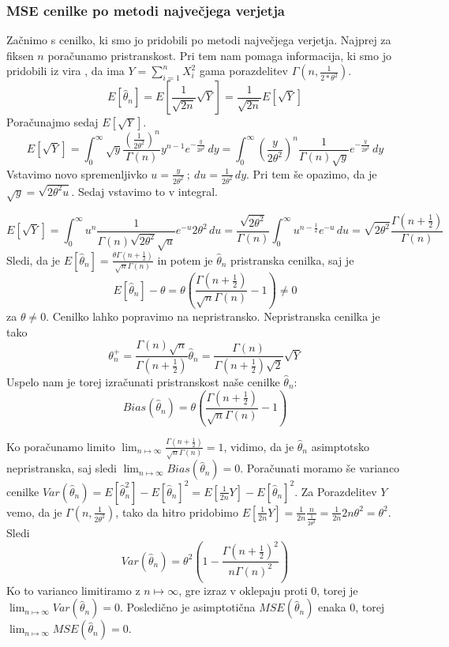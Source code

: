 \documentclass[a4paper, 10pt]{article}
\begin{document}
	\subsubsection{MSE cenilke po metodi največjega verjetja}\label{subsubsect: 2C1}
	Začnimo s cenilko, ki smo jo pridobili po metodi največjega verjetja. Najprej za fiksen $n$ poračunamo pristranskost. Pri tem nam pomaga informacija, ki smo jo pridobili iz vira \cite{bib:Rayleigh}, da ima $Y = \sum_{i = 1}^{n} X_i^2$ gama porazdelitev $\Gamma(n, \frac{1}{2*\theta^2})$.
	\begin{equation*}
		E[\widehat{\theta}_n] = E[\frac{1}{\sqrt{2n}}\sqrt{Y}] = \frac{1}{\sqrt{2n}} E[\sqrt{Y}]
	\end{equation*}
	Poračunajmo sedaj $E[\sqrt{Y}]$.
	\begin{equation*}
		E[\sqrt{Y}] =  \int_{0}^{\infty}\sqrt{y}\frac{(\frac{1}{2\theta^2})^n}{\Gamma(n)}y^{n-1}e^{-\frac{y}{2\theta^2}}\, dy = \int_{0}^{\infty}(\frac{y}{2\theta^{2}})^n\frac{1}{\Gamma(n)\sqrt{y}} e^{-\frac{y}{2\theta^2}}\,dy
	\end{equation*}
	Vstavimo novo spremenljivko $u = \frac{y}{2\theta^2}~;~du = \frac{1}{2\theta^2}\, dy$. Pri tem še opazimo, da je $\sqrt{y} = \sqrt{2\theta^2 u}$. Sedaj vstavimo to v integral.
	
	\begin{equation*}
		E[\sqrt{Y}] = \int_{0}^{\infty} u^n \frac{1}{\Gamma(n)\sqrt{2\theta^2}\sqrt{u}} e^{-u} 2\theta^2\,du = \frac{\sqrt{2\theta^2}}{\Gamma(n)} \int_{0}^{\infty} u^{n - \frac{1}{2}} e^{-u}\,du = \sqrt{2\theta^2}\frac{\Gamma(n+\frac{1}{2})}{\Gamma(n)}
	\end{equation*}
	Sledi, da je $E[\widehat{\theta}_n] = \frac{\theta\Gamma(n + \frac{1}{2})}{\sqrt{n}\Gamma(n)}$ in potem je $\widehat{\theta}_n$ pristranska cenilka, saj je $$E[\widehat{\theta}_n] - \theta = \theta (\frac{\Gamma(n + \frac{1}{2})}{\sqrt{n}\Gamma(n)} - 1) \neq 0$$ za $\theta\neq 0$. Cenilko lahko popravimo na nepristransko. Nepristranska cenilka je tako $$\theta_n^+ = \frac{\Gamma(n)\sqrt{n}}{\Gamma(n + \frac{1}{2})}\widehat{\theta}_n = \frac{\Gamma(n)}{\Gamma(n + \frac{1}{2})\sqrt{2}}\sqrt{Y}$$
	Uspelo nam je torej izračunati pristranskost naše cenilke $\widehat{\theta}_n$: $$Bias(\widehat{\theta}_n) = \theta(\frac{\Gamma(n + \frac{1}{2})}{\sqrt{n}\Gamma(n)} - 1)$$
	
	Ko poračunamo limito $\lim_{n\mapsto\infty} \frac{\Gamma(n + \frac{1}{2})}{\sqrt{n}\Gamma(n)} = 1$, vidimo, da je $\widehat{\theta}_n$ asimptotsko nepristranska, saj sledi $\lim_{n\mapsto\infty}Bias(\widehat{\theta}_n) = 0$. Poračunati moramo še varianco cenilke $Var(\widehat{\theta}_n) = E[\widehat{\theta}_n^2] - E[\widehat{\theta}_n]^2 = E[\frac{1}{2n} Y] - E[\widehat{\theta}_n]^2$. Za Porazdelitev $Y$ vemo, da je $\Gamma(n, \frac{1}{2\theta^2})$, tako da hitro pridobimo $E[\frac{1}{2n} Y] = \frac{1}{2n}\frac{n}{\frac{1}{2\theta^2}} = \frac{1}{2n}2n\theta^2 = \theta^2$. Sledi $$Var(\widehat{\theta}_n) = \theta^2(1 - \frac{\Gamma(n + \frac{1}{2})^2}{n\Gamma(n)^2})$$
	Ko to varianco limitiramo z $n\mapsto\infty$, gre izraz v oklepaju proti $0$, torej je $\lim_{n\mapsto\infty}Var(\widehat{\theta}_n) = 0$. Posledično je asimptotična $MSE(\widehat{\theta}_n)$ enaka $0$, torej $\lim_{n\mapsto\infty}MSE(\widehat{\theta}_n) = 0$.
	
\end{document}
